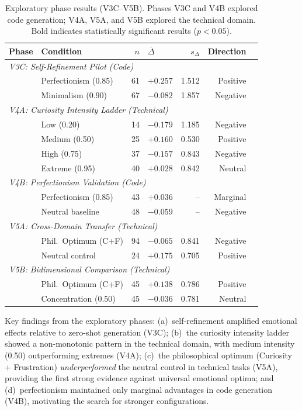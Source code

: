 \documentclass[lineno]{wlpeerj}
\begin{document}
\begin{table}[H]
\centering
\caption{Exploratory phase results (V3C--V5B). Phases V3C and V4B explored code generation; V4A, V5A, and V5B explored the technical domain. Bold indicates statistically significant results ($p < 0.05$).}
\label{tab:exploratory}
\small
\begin{tabular}{@{}llrlrrr@{}}
\toprule
\textbf{Phase} & \textbf{Condition} & \textbf{$n$} & $\bar{\Delta}$ & $s_\Delta$ & \textbf{Direction} \\
\midrule
\multicolumn{6}{l}{\textit{V3C: Self-Refinement Pilot (Code)}} \\
& Perfectionism (0.85) & 61 & $+0.257$ & 1.512 & Positive \\
& Minimalism (0.90) & 67 & $-0.082$ & 1.857 & Negative \\
\midrule
\multicolumn{6}{l}{\textit{V4A: Curiosity Intensity Ladder (Technical)}} \\
& Low (0.20) & 14 & $-0.179$ & 1.185 & Negative \\
& Medium (0.50) & 25 & $+0.160$ & 0.530 & Positive \\
& High (0.75) & 37 & $-0.157$ & 0.843 & Negative \\
& Extreme (0.95) & 40 & $+0.028$ & 0.842 & Neutral \\
\midrule
\multicolumn{6}{l}{\textit{V4B: Perfectionism Validation (Code)}} \\
& Perfectionism (0.85) & 43 & $+0.036$ & -- & Marginal \\
& Neutral baseline & 48 & $-0.059$ & -- & Negative \\
\midrule
\multicolumn{6}{l}{\textit{V5A: Cross-Domain Transfer (Technical)}} \\
& Phil.\ Optimum (C+F) & 94 & $-0.065$ & 0.841 & Negative \\
& Neutral control & 24 & $+0.175$ & 0.705 & Positive \\
\midrule
\multicolumn{6}{l}{\textit{V5B: Bidimensional Comparison (Technical)}} \\
& Phil.\ Optimum (C+F) & 45 & $+0.138$ & 0.786 & Positive \\
& Concentration (0.50) & 45 & $-0.036$ & 0.781 & Neutral \\
\bottomrule
\end{tabular}
\end{table}

Key findings from the exploratory phases: (a)~self-refinement amplified emotional effects relative to zero-shot generation (V3C); (b)~the curiosity intensity ladder showed a non-monotonic pattern in the technical domain, with medium intensity (0.50) outperforming extremes (V4A); (c)~the philosophical optimum (Curiosity + Frustration) \textit{underperformed} the neutral control in technical tasks (V5A), providing the first strong evidence against universal emotional optima; and (d)~perfectionism maintained only marginal advantages in code generation (V4B), motivating the search for stronger configurations.
\end{document}
